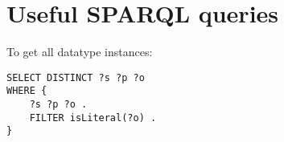 \section{Useful SPARQL queries}
To get all datatype instances: %
\begin{verbatim}
SELECT DISTINCT ?s ?p ?o
WHERE {
	?s ?p ?o .
	FILTER isLiteral(?o) .
}
\end{verbatim}









% 
% 
% 				
